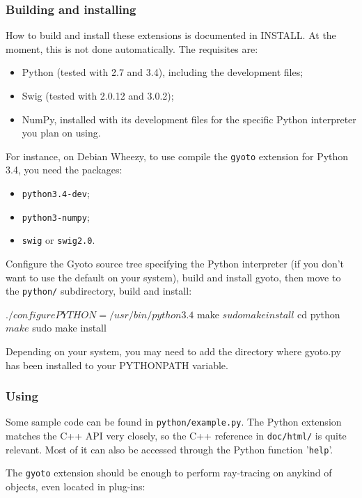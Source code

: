 \documentclass[a4paper,12pt]{article}
\begin{document}
\subsubsection{Building and installing}

How to build and install these extensions is documented in INSTALL. At
the moment, this is not done automatically. The requisites are:
\begin{itemize}
\item Python (tested with 2.7 and 3.4), including the development
  files;
\item Swig (tested with 2.0.12 and 3.0.2);
\item NumPy, installed with its development files for the specific
  Python interpreter you plan on using.
\end{itemize}
For instance, on Debian Wheezy, to use compile the \texttt{gyoto}
extension for Python 3.4, you need the packages:
\begin{itemize}
\item \texttt{python3.4-dev};
\item \texttt{python3-numpy};
\item \texttt{swig} or \texttt{swig2.0}.
\end{itemize}
Configure the Gyoto source tree specifying the Python interpreter (if
you don't want to use the default on your system), build and install
gyoto, then move to the \texttt{python/} subdirectory, build and install:
\begin{code}
 $ ./configure PYTHON=/usr/bin/python3.4
 $ make
 $ sudo make install
 $ cd python
 $ make
 $ sudo make install
\end{code}
Depending on your system, you may need to add the directory where
gyoto.py has been installed to your PYTHONPATH variable.

\subsubsection{Using}

Some sample code can be found in \texttt{python/example.py}. The
Python extension matches the C++ API very closely, so the C++
reference in \texttt{doc/html/} is quite relevant. Most of it can also
be accessed through the Python function '\texttt{help}'.

The \texttt{gyoto} extension should be enough to perform ray-tracing
on anykind of objects, even located in plug-ins:
\end{document}
